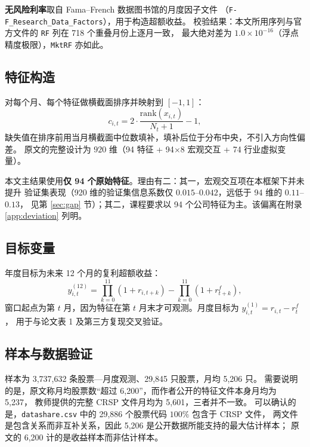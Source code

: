 \documentclass[11pt,a4paper,fontset=windows]{ctexart}
\newcommand{\code}[1]{\texttt{#1}}
\begin{document}
\textbf{无风险利率}取自 Fama--French 数据图书馆的月度因子文件
（\code{F-F\_Research\_Data\_Factors}），用于构造超额收益。
校验结果：本文所用序列与官方文件的 \code{RF} 列在 718 个重叠月份上逐月一致，
最大绝对差为 $1.0\times10^{-16}$（浮点精度极限），\code{MktRF} 亦如此。

\subsection{特征构造}

对每个月、每个特征做横截面排序并映射到 $[-1,1]$：
\begin{equation}
c_{i,t} = 2\cdot\frac{\mathrm{rank}(x_{i,t})}{N_t+1} - 1 ,
\end{equation}
缺失值在排序前用当月横截面中位数填补，填补后位于分布中央，不引入方向性偏差。
原文的完整设计为 $920$ 维（94 特征 + 94$\times$8 宏观交互 + 74 行业虚拟变量）。

本文主结果使用\textbf{仅 94 个原始特征}。理由有二：其一，宏观交互项在本框架下并未提升
验证集表现（920 维的验证集信息系数仅 $0.015$--$0.042$，远低于 94 维的 $0.11$--$0.13$，
见第 \ref{sec:gap} 节）；其二，课程要求以 94 个公司特征为主。该偏离在附录 \ref{app:deviation} 列明。

\subsection{目标变量}

年度目标为未来 12 个月的复利超额收益：
\begin{equation}
y_{i,t}^{(12)} = \prod_{k=0}^{11}\left(1+r_{i,t+k}\right) - \prod_{k=0}^{11}\left(1+r^f_{t+k}\right),
\end{equation}
窗口起点为第 $t$ 月，因为特征在第 $t$ 月末才可观测。月度目标为 $y_{i,t}^{(1)} = r_{i,t} - r^f_t$，
用于与论文表 1 及第三方复现交叉验证。

\subsection{样本与数据验证}\label{sec:validation}

样本为 3{,}737{,}632 条股票—月度观测、29{,}845 只股票，月均 5{,}206 只。
需要说明的是，原文称月均股票数``超过 6{,}200''，而作者公开的特征文件本身月均为 5{,}237，
教师提供的完整 CRSP 文件月均为 5{,}601，三者并不一致。
可以确认的是，\code{datashare.csv} 中的 29{,}886 个股票代码 $100\%$ 包含于 CRSP 文件，
两文件是包含关系而非互补关系，因此 5{,}206 是公开数据所能支持的最大估计样本；
原文的 6{,}200 计的是收益样本而非估计样本。
\end{document}

